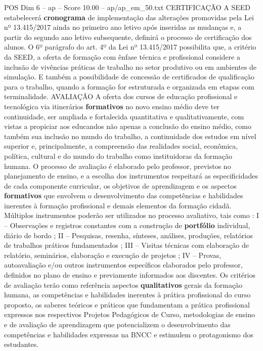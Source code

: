 \begin{textsample}{POS Dim 6 – ap – Score 10.00 – ap/ap\_em\_50.txt}  \label{ex:f6_pos_104}
CERTIFICAÇÃO A SEED estabelecerá \textbf{cronograma} de implementação das alterações promovidas pela Lei nº 13.415/2017 ainda no primeiro ano letivo após inseridas as mudanças e, a partir do segundo ano letivo subsequente, definirá o processo de certificação dos alunos.
O 6º parágrafo do art. 4º da Lei nº 13.415/2017 possibilita que, a critério da SEED, a oferta de formação com ênfase técnica e profissional considere a inclusão de vivências práticas de trabalho no setor produtivo ou em ambientes de simulação.
E também a possibilidade de concessão de certificados de qualificação para o trabalho, quando a formação for estruturada e organizada em etapas com terminalidade.
AVALIAÇÃO A oferta dos cursos de educação profissional e tecnológica via itinerários \textbf{formativos} no novo ensino médio deve ter continuidade, ser ampliada e fortalecida quantitativa e qualitativamente, com vistas a propiciar aos educandos não apenas a conclusão do ensino médio, como também sua inclusão no mundo do trabalho, a continuidade dos estudos em nível superior e, principalmente, a compreensão das realidades social, econômica, política, cultural e do mundo do trabalho como instituidoras da formação humana.
O processo de avaliação é elaborado pelo professor, previstos no planejamento de ensino, e a escolha dos instrumentos respeitará as especificidades de cada componente curricular, os objetivos de aprendizagem e os aspectos \textbf{formativos} que envolvem o desenvolvimento das competências e habilidades inerentes à formação profissional e demais elementos da formação cidadã.
Múltiplos instrumentos poderão ser utilizados no processo avaliativo, tais como : I – Observações e registros constantes com a construção de \textbf{portfólio} individual, diário de bordo ; II – Pesquisas, resenha, sínteses, análises, produções, relatórios de trabalhos práticos fundamentados ; III – Visitas técnicas com elaboração de relatório, seminários, elaboração e execução de projetos ; IV – Provas, autoavaliação e/ou outros instrumentos específicos elaborados pelo professor, definidos no plano de ensino e previamente informados aos discentes.
Os critérios de avaliação terão como referência aspectos \textbf{qualitativos} gerais da formação humana, as competências e habilidades inerentes à prática profissional do curso proposto, os saberes teóricos e práticos que fundamentam a prática profissional expressos nos respectivos Projetos Pedagógicos de Curso, metodologias de ensino e de avaliação de aprendizagem que potencializem o desenvolvimento das competências e habilidades expressas na BNCC e estimulem o protagonismo dos estudantes.

\end{textsample}
